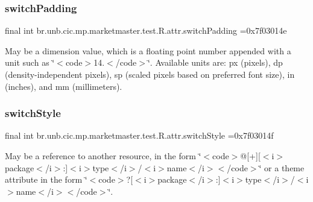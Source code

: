 \subsubsection{\texorpdfstring{switch\+Padding}{switchPadding}}
{\footnotesize\ttfamily final int br.\+unb.\+cic.\+mp.\+marketmaster.\+test.\+R.\+attr.\+switch\+Padding =0x7f03014e\hspace{0.3cm}{\ttfamily [static]}}

May be a dimension value, which is a floating point number appended with a unit such as \char`\"{}$<$code$>$14.\+5sp$<$/code$>$\char`\"{}. Available units are\+: px (pixels), dp (density-\/independent pixels), sp (scaled pixels based on preferred font size), in (inches), and mm (millimeters). \mbox{\label{classbr_1_1unb_1_1cic_1_1mp_1_1marketmaster_1_1test_1_1R_1_1attr_a87c45b61ce9828bc375aef4849c2c6a9}} 
\subsubsection{\texorpdfstring{switch\+Style}{switchStyle}}
{\footnotesize\ttfamily final int br.\+unb.\+cic.\+mp.\+marketmaster.\+test.\+R.\+attr.\+switch\+Style =0x7f03014f\hspace{0.3cm}{\ttfamily [static]}}

May be a reference to another resource, in the form \char`\"{}$<$code$>$@\mbox{[}+\mbox{]}\mbox{[}$<$i$>$package$<$/i$>$\+:\mbox{]}$<$i$>$type$<$/i$>$/$<$i$>$name$<$/i$>$$<$/code$>$\char`\"{} or a theme attribute in the form \char`\"{}$<$code$>$?\mbox{[}$<$i$>$package$<$/i$>$\+:\mbox{]}$<$i$>$type$<$/i$>$/$<$i$>$name$<$/i$>$$<$/code$>$\char`\"{}. \mbox{\label{classbr_1_1unb_1_1cic_1_1mp_1_1marketmaster_1_1test_1_1R_1_1attr_aa026b72a2fc37fc9aa961679fdcf5a4e}} 
